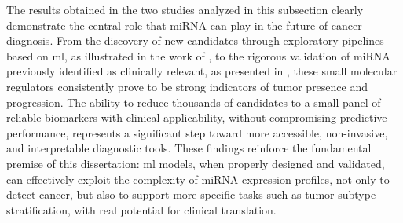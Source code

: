 The results obtained in the two studies analyzed in this subsection clearly
demonstrate the central role that miRNA can play in the future of cancer
diagnosis. From the discovery of new candidates through exploratory pipelines
based on \gls{ml}, as illustrated in the work of
\textcite{ml_gastric_Azari2023}, to the rigorous validation of miRNA
previously identified as clinically relevant, as presented in
\textcite{val_of_mirna_as_biomarker_Rehman_2019}, these small molecular
regulators consistently prove to be strong indicators of tumor presence and
progression. The ability to reduce thousands of candidates to a small panel of
reliable biomarkers with clinical applicability, without compromising
predictive performance, represents a significant step toward more accessible,
non-invasive, and interpretable diagnostic tools. These findings reinforce the
fundamental premise of this dissertation: \gls{ml} models, when properly
designed and validated, can effectively exploit the complexity of miRNA
expression profiles, not only to detect cancer, but also to support more
specific tasks such as tumor subtype stratification, with real potential for
clinical translation.


